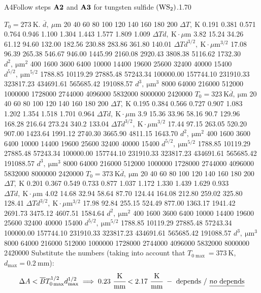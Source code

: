 \documentclass[11pt,a4paper]{article}
\begin{document}
\begin{solcard}{A4}{Follow steps $\bf A2$ and $\bf A3$ for tungsten sulfide $\rm(WS_2)$.}{1.70}

$T_0=273~\mathrm{K}$. $\overline{d},~\mu\text{m}$ 20 40 60 80 100 120 140 160 180 200 $\Delta T,~\mathrm{K}$ 0.191 0.381 0.571 0.764 0.946 1.100 1.304 1.443 1.577 1.809 1.009 $\Delta Td,~\mathrm{K}\cdot\mu\text{m}$ 3.82 15.24 34.26 61.12 94.60 132.00 182.56 230.88 283.86 361.80 140.01 $\Delta Td^{3/2},~\mathrm{K}\cdot\mu\text{m}^{3/2}$ 17.08 96.39 265.38 546.67 946.00 1445.99 2160.08 2920.43 3808.38 5116.62 1732.30 $d^2,~\mathrm{\mu m}^2$ 400 1600 3600 6400 10000 14400 19600 25600 32400 40000 15400 $d^{5/2},~\mathrm{\mu m}^{5/2}$ 1788.85 10119.29 27885.48 57243.34 100000.00 157744.10 231910.33 323817.23 434691.61 565685.42 191088.57 $d^3,~\mathrm{\mu m}^3$ 8000 64000 216000 512000 1000000 1728000 2744000 4096000 5832000 8000000 2420000 $T_0=323~\mathrm{K}\overline{d},~\mathrm{\mu m}$ 20 40 60 80 100 120 140 160 180 200 $\Delta T,~\mathrm{K}$ 0.195 0.384 0.566 0.727 0.907 1.083 1.202 1.354 1.518 1.701 0.964 $\Delta Td,~\mathrm{K}\cdot\mu\text{m}$ 3.9 15.36 33.96 58.16 90.7 129.96 168.28 216.64 273.24 340.2 133.04 $\Delta Td^{3/2},~\mathrm{K}\cdot\mu\text{m}^{3/2}$ 17.44 97.15 263.05 520.20 907.00 1423.64 1991.12 2740.30 3665.90 4811.15 1643.70 $d^2,~\mathrm{\mu m}^2$ 400 1600 3600 6400 10000 14400 19600 25600 32400 40000 15400 $d^{5/2},~\mathrm{\mu m}^{5/2}$ 1788.85 10119.29 27885.48 57243.34 100000.00 157744.10 231910.33 323817.23 434691.61 565685.42 191088.57 $d^3,~\mathrm{\mu m}^3$ 8000 64000 216000 512000 1000000 1728000 2744000 4096000 5832000 8000000 2420000 $T_0=373~\mathrm{K}\overline{d},~\mathrm{\mu m}$ 20 40 60 80 100 120 140 160 180 200 $\Delta T,~\mathrm{K}$ 0.201 0.367 0.549 0.733 0.877 1.037 1.172 1.330 1.439 1.629 0.933 $\Delta Td,~\mathrm{K}\cdot\mu\text{m}$ 4.02 14.68 32.94 58.64 87.70 124.44 164.08 212.80 259.02 325.80 128.41 $\Delta Td^{3/2},~\mathrm{K}\cdot\mu\text{m}^{3/2}$ 17.98 92.84 255.15 524.49 877.00 1363.17 1941.42 2691.73 3475.12 4607.51 1584.64 $d^2,~\mathrm{\mu m}^2$ 400 1600 3600 6400 10000 14400 19600 25600 32400 40000 15400 $d^{5/2},~\mathrm{\mu m}^{5/2}$ 1788.85 10119.29 27885.48 57243.34 100000.00 157744.10 231910.33 323817.23 434691.61 565685.42 191088.57 $d^3,~\mathrm{\mu m}^3$ 8000 64000 216000 512000 1000000 1728000 2744000 4096000 5832000 8000000 2420000 Substitute the numbers (taking into account that $T_{0\max}=373~\mathrm{K}$, $d_{\max}=0.2~\mathrm{mm}$): \[\Delta A < \overline BT_{0\max}^{1/2}d_{\max}^{1/2}\implies0.23~\cfrac{\mathrm{K}}{\mathrm{mm}} < 2.17~\cfrac{\mathrm{K}}{\mathrm{mm}}~-~\text{depends}~/~\underline{no~\text{depends}}\]



\end{solcard}
\end{document}
